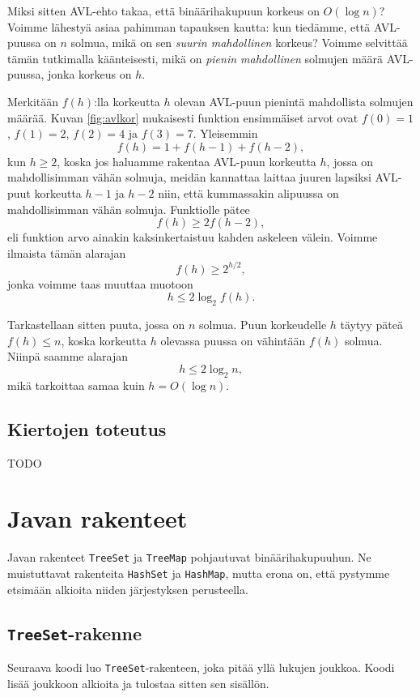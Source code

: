 Miksi sitten AVL-ehto takaa, että binäärihakupuun korkeus
on $O(\log n)$?
Voimme lähestyä asiaa pahimman tapauksen kautta:
kun tiedämme, että AVL-puussa on $n$ solmua,
mikä on sen \emph{suurin mahdollinen} korkeus?
Voimme selvittää tämän tutkimalla käänteisesti,
mikä on \emph{pienin mahdollinen} solmujen määrä
AVL-puussa, jonka korkeus on $h$.

Merkitään $f(h)$:lla korkeutta $h$ olevan AVL-puun
pienintä mahdollista solmujen määrää.
Kuvan \ref{fig:avlkor} mukaisesti funktion ensimmäiset arvot
ovat $f(0)=1$, $f(1)=2$, $f(2)=4$ ja $f(3)=7$.
Yleisemmin
\[f(h)=1+f(h-1)+f(h-2),\]
kun $h \ge 2$, koska jos haluamme rakentaa AVL-puun korkeutta $h$,
jossa on mahdollisimman vähän solmuja,
meidän kannattaa laittaa juuren lapsiksi AVL-puut
korkeutta $h-1$ ja $h-2$ niin,
että kummassakin alipuussa on mahdollisimman vähän solmuja.
Funktiolle pätee
\[f(h) \ge 2 f(h-2),\]
eli funktion arvo ainakin kaksinkertaistuu kahden askeleen välein.
Voimme ilmaista tämän alarajan
\[f(h) \ge 2^{h/2},\]
jonka voimme taas muuttaa muotoon
\[ h \le 2 \log_2 f(h).\]

Tarkastellaan sitten puuta, jossa on $n$ solmua.
Puun korkeudelle $h$ täytyy päteä $f(h) \le n$,
koska korkeutta $h$ olevassa puussa on vähintään $f(h)$ solmua.
Niinpä saamme alarajan
\[h \le 2 \log_2 n,\]
mikä tarkoittaa samaa kuin $h = O(\log n)$.

\subsection{Kiertojen toteutus}

TODO

\section{Javan rakenteet}

Javan rakenteet \texttt{TreeSet} ja \texttt{TreeMap}
pohjautuvat binäärihakupuuhun.
Ne muistuttavat rakenteita \texttt{HashSet} ja \texttt{HashMap},
mutta erona on, että pystymme etsimään
alkioita niiden järjestyksen perusteella.

\subsection{\texttt{TreeSet}-rakenne}

Seuraava koodi luo \texttt{TreeSet}-rakenteen,
joka pitää yllä lukujen joukkoa.
Koodi lisää joukkoon alkioita ja tulostaa sitten sen sisällön.

